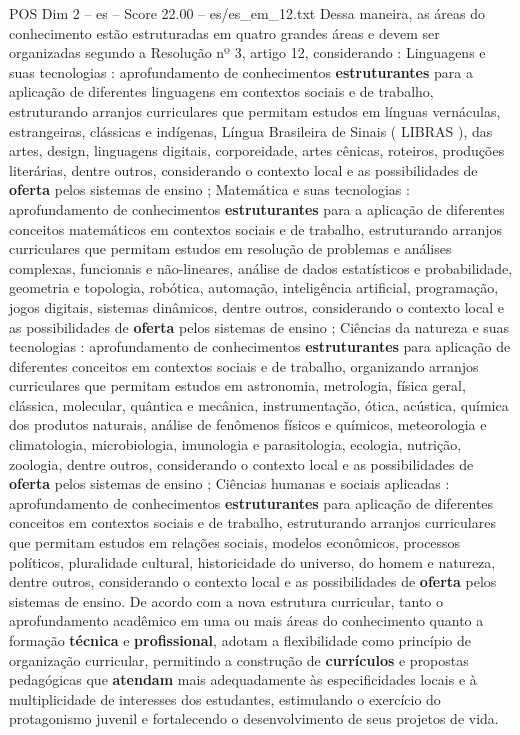 \begin{textsample}{POS Dim 2 – es – Score 22.00 – es/es\_em\_12.txt}
Dessa maneira, as áreas do conhecimento estão estruturadas em quatro grandes áreas e devem ser organizadas segundo a Resolução nº 3, artigo 12, considerando : Linguagens e suas tecnologias : aprofundamento de conhecimentos \textbf{estruturantes} para a aplicação de diferentes linguagens em contextos sociais e de trabalho, estruturando arranjos curriculares que permitam estudos em línguas vernáculas, estrangeiras, clássicas e indígenas, Língua Brasileira de Sinais ( LIBRAS ), das artes, design, linguagens digitais, corporeidade, artes cênicas, roteiros, produções literárias, dentre outros, considerando o contexto local e as possibilidades de \textbf{oferta} pelos sistemas de ensino ; Matemática e suas tecnologias : aprofundamento de conhecimentos \textbf{estruturantes} para a aplicação de diferentes conceitos matemáticos em contextos sociais e de trabalho, estruturando arranjos curriculares que permitam estudos em resolução de problemas e análises complexas, funcionais e não-lineares, análise de dados estatísticos e probabilidade, geometria e topologia, robótica, automação, inteligência artificial, programação, jogos digitais, sistemas dinâmicos, dentre outros, considerando o contexto local e as possibilidades de \textbf{oferta} pelos sistemas de ensino ; Ciências da natureza e suas tecnologias : aprofundamento de conhecimentos \textbf{estruturantes} para aplicação de diferentes conceitos em contextos sociais e de trabalho, organizando arranjos curriculares que permitam estudos em astronomia, metrologia, física geral, clássica, molecular, quântica e mecânica, instrumentação, ótica, acústica, química dos produtos naturais, análise de fenômenos físicos e químicos, meteorologia e climatologia, microbiologia, imunologia e parasitologia, ecologia, nutrição, zoologia, dentre outros, considerando o contexto local e as possibilidades de \textbf{oferta} pelos sistemas de ensino ; Ciências humanas e sociais aplicadas : aprofundamento de conhecimentos \textbf{estruturantes} para aplicação de diferentes conceitos em contextos sociais e de trabalho, estruturando arranjos curriculares que permitam estudos em relações sociais, modelos econômicos, processos políticos, pluralidade cultural, historicidade do universo, do homem e natureza, dentre outros, considerando o contexto local e as possibilidades de \textbf{oferta} pelos sistemas de ensino.
De acordo com a nova estrutura curricular, tanto o aprofundamento acadêmico em uma ou mais áreas do conhecimento quanto a formação \textbf{técnica} e \textbf{profissional}, adotam a flexibilidade como princípio de organização curricular, permitindo a construção de \textbf{currículos} e propostas pedagógicas que \textbf{atendam} mais adequadamente às especificidades locais e à multiplicidade de interesses dos estudantes, estimulando o exercício do protagonismo juvenil e fortalecendo o desenvolvimento de seus projetos de vida.

\end{textsample}
